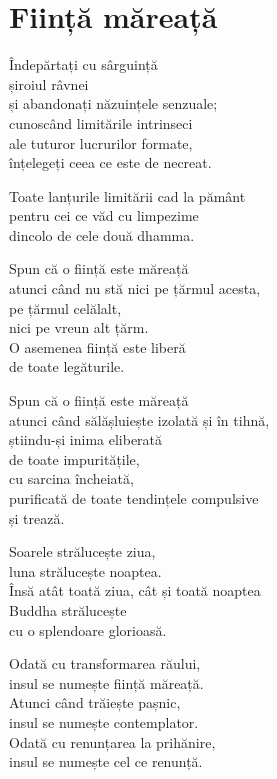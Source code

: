 
\chapter{Ființă măreață}


Îndepărtați cu sârguință\\
șiroiul râvnei\\
și abandonați năzuințele senzuale;\\
cunoscând limitările intrinseci\\
ale tuturor lucrurilor formate,\\
înțelegeți ceea ce este de necreat.


Toate lanțurile limitării cad la pământ\\
pentru cei ce văd cu limpezime\\
dincolo de cele două dhamma.


Spun că o ființă este măreață\\
atunci când nu stă nici pe țărmul acesta,\\
pe țărmul celălalt,\\
nici pe vreun alt țărm.\\
O asemenea ființă este liberă\\
de toate legăturile.


Spun că o ființă este măreață\\
atunci când sălășluiește izolată și în tihnă,\\
știindu-și inima eliberată\\
de toate impuritățile,\\
cu sarcina încheiată,\\
purificată de toate tendințele compulsive\\
și trează.


Soarele strălucește ziua,\\
luna strălucește noaptea.\\
Însă atât toată ziua, cât și toată noaptea\\
Buddha strălucește\\
cu o splendoare glorioasă.


Odată cu transformarea răului,\\
insul se numește ființă măreață.\\
Atunci când trăiește pașnic,\\
insul se numește contemplator.\\
Odată cu renunțarea la prihănire,\\
insul se numește cel ce renunță.


